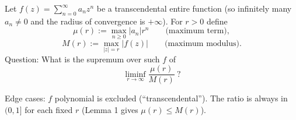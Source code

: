 Let $f(z)=\sum_{n=0}^{\infty} a_n z^n$ be a transcendental entire function (so infinitely many $a_n\neq 0$ and the radius of convergence is $+\infty$). For $r>0$ define
\[
\mu(r):=\max_{n\ge 0} |a_n| r^n\qquad\text{(maximum term)},
\]
\[
M(r):=\max_{|z|=r} |f(z)|\qquad\text{(maximum modulus)}.
\]
Question: What is the supremum over such $f$ of
\[
\liminf_{r\to\infty} \frac{\mu(r)}{M(r)}\ ?
\]

Edge cases: $f$ polynomial is excluded (``transcendental''). The ratio is always in $(0,1]$ for each fixed $r$ (Lemma 1 gives $\mu(r)\le M(r)$).

